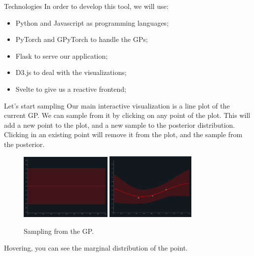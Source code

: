 \documentclass[xcolor=dvipsnames,t,aspectratio=169]{beamer} %
\newcommand{\highlight}[1]{{\color{fgv_light_blue} #1}}
\begin{document}
\begin{frame}[c]{Technologies}
    In order to develop this tool, we will use:

    \begin{itemize}
        \item \highlight{Python} and \highlight{Javascript} as programming languages;
        \item \highlight{PyTorch} and \highlight{GPyTorch} to handle the GPs;
        \item \highlight{Flask} to \highlight{serve} our application;
        \item \highlight{D3.js} to deal with the \highlight{visualizations};
        \item \highlight{Svelte} to give us a \highlight{reactive} frontend;
    \end{itemize} 
    
\end{frame}

\begin{frame}[c]{Let's start \highlight{sampling}}
    Our main interactive visualization is a \highlight{line plot} of the current GP. We can \highlight{sample} from it by clicking on any point of the plot. This will add a new point to the plot, and a new sample to the \highlight{posterior} distribution. Clicking in an existing point will remove it from the plot, and the sample from the posterior.

    \begin{figure}[H]
        \centering
        \includegraphics[width=0.4\textwidth]{imgs/observing.png}
        \includegraphics[width=0.39\textwidth]{imgs/observed.png}
        \caption{Sampling from the GP.}
    \end{figure}

    Hovering, you can see the \highlight{marginal} distribution of the point.
\end{frame}
\end{document}

